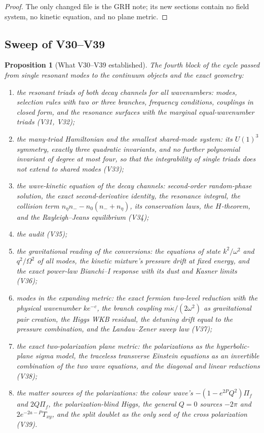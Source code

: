 \documentclass[11pt]{article}
\newtheorem{proposition}[theorem]{Proposition}
\theoremstyle{remark}
\begin{document}
\begin{proof}
The only changed file is the GRH note; its new sections contain no
field system, no kinetic equation, and no plane metric.
\end{proof}

\subsection{Sweep of V30--V39}

\begin{proposition}[What V30--V39 established]
\label{prop:v20v40-sweep}
The fourth block of the cycle passed from single resonant modes to
the continuum objects and the exact geometry:

\begin{enumerate}
\item the resonant triads of both decay channels for all
wavenumbers: modes, selection rules with two or three branches,
frequency conditions, couplings in closed form, and the resonance
surfaces with the marginal equal-wavenumber triads (V31, V32);
\item the many-triad Hamiltonian and the smallest shared-mode
system: its \(U(1)^3\) symmetry, exactly three quadratic invariants,
and no further polynomial invariant of degree at most four, so that
the integrability of single triads does not extend to shared modes
(V33);
\item the wave-kinetic equation of the decay channels: second-order
random-phase solution, the exact second-derivative identity, the
resonance integral, the collision term
\(n_\eta n_--n_0(n_-+n_\eta)\), its conservation laws, the
\(H\)-theorem, and the Rayleigh--Jeans equilibrium (V34);
\item the audit (V35);
\item the gravitational reading of the conversions: the equations
of state \(k^2/\omega^2\) and \(q^2/\Omega^2\) of all modes, the kinetic
mixture's pressure drift at fixed energy, and the exact power-law
Bianchi--I response with its dust and Kasner limits (V36);
\item modes in the expanding metric: the exact fermion two-level
reduction with the physical wavenumber \(ke^{-c}\), the branch
coupling \(m\dot\kappa/(2\omega^2)\) as gravitational pair creation,
the Higgs WKB residual, the detuning drift equal to the pressure
combination, and the Landau--Zener sweep law (V37);
\item the exact two-polarization plane metric: the polarizations as
the hyperbolic-plane sigma model, the traceless transverse Einstein
equations as an invertible combination of the two wave equations,
and the diagonal and linear reductions (V38);
\item the matter sources of the polarizations: the colour wave's
\(-(1-e^{2P}Q^2)\Pi_f\) and \(2Q\Pi_f\), the polarization-blind Higgs,
the general \(Q=0\) sources \(-2\pi\) and \(2e^{-2a-P}T_{xy}\), and the
split doublet as the only seed of the cross polarization (V39).
\end{enumerate}
\end{proposition}
\end{document}
